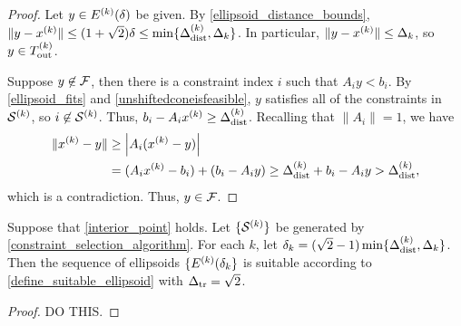 \documentclass{article}
\begin{document}
\begin{proof}
Let $y \in {E^{(k)}}(\delta)$ be given.   By \cref{ellipsoid_distance_bounds}, $\|y-x^{(k)}\| \le (1+\sqrt{2}) \delta \le \min\{\Delta_{\textrm{dist}}^{(k)},\Delta_k\}$.  In particular, $\|y-x^{(k)}\| \le \Delta_k$, so $y \in {T_{\text{out}}^{(k)}}$.   

Suppose $y \not \in {\mathcal F}$, then there is a constraint index $i$ such that $A_i y < b_i$.   By \cref{ellipsoid_fits} and \cref{unshiftedconeisfeasible}, $y$ satisfies all of the constraints in $\mathcal{S}^{(k)}$, so $i \not \in \mathcal{S}^{(k)}$.   Thus, $b_i-A_i x^{(k)} \ge \Delta_{\textrm{dist}}^{(k)}$.
Recalling that $\|A_i\|=1$, we have
\begin{align*} \|x^{(k)}-y\| & \ge \left|A_i (x^{(k)}-y)\right| \\
 & = (A_i x^{(k)} - b_i) + (b_i - A_i y)   \ge \Delta_{\textrm{dist}}^{(k)} + b_i - A_i y > \Delta_{\textrm{dist}}^{(k)},
\end{align*}
which is a contradiction.  Thus, $y \in {\mathcal F}$.
\end{proof}

\begin{lemma}
Suppose that \cref{interior_point} holds.   Let $\{\mathcal{S}^{(k)}\}$ be generated by \cref{constraint_selection_algorithm}.    For each $k$, let ${\delta_k} = (\sqrt{2}-1)\min\{\Delta_{\textrm{dist}}^{(k)}, \Delta_k\}$.    Then the sequence of ellipsoids $\{{E^{(k)}}({\delta_k}\}$ is suitable according to \cref{define_suitable_ellipsoid} with $\Delta_{\textrm{tr}} = \sqrt{2}$.
\end{lemma}

\begin{proof}
DO THIS.
\vspace{4in}
\end{proof}
\end{document}
